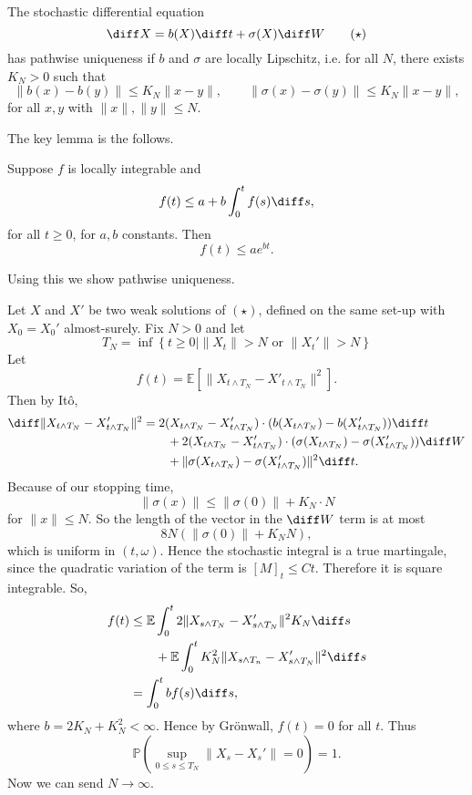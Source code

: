 \documentclass[12pt]{article}
\begin{document}
\begin{theorem}
	The stochastic differential equation
	\[
		\diff X = b(X) \diff t + \sigma(X) \diff W \tag{$\star$}
	\]
	has pathwise uniqueness if $b$ and $\sigma$ are locally Lipschitz, i.e. for all $N$, there exists $K_N > 0$ such that
	\[
	\|b(x) - b(y)\| \leq K_N \|x - y\|, \qquad \|\sigma(x) - \sigma(y)\| \leq K_N \|x - y\|,
	\]
	for all $x, y$ with $\|x\|, \|y\| \leq N$.
\end{theorem}

The key lemma is the follows.
\begin{lemma}
	Suppose $f$ is locally integrable and
	\[
	f(t) \leq a + b \int_0^{t} f(s) \diff s,
	\]
	for all $t \geq 0$, for $a, b$ constants. Then
	\[
	f(t) \leq a e^{bt}.
	\]
\end{lemma}

Using this we show pathwise uniqueness.

\begin{proofbox}
	Let $X$ and $X'$ be two weak solutions of $(\star)$, defined on the same set-up with $X_0 = X_0'$ almost-surely. Fix $N > 0$ and let
	\[
		T_N = \inf \left\{ t \geq 0 \mid \|X_t\| > N \text{ or } \|X_t'\| > N\right\}
	\]
	Let
	\[
	f(t) = \mathbb{E}\left[ \|X_{t \wedge T_N} - X'_{t \wedge T_N}\|^2 \right].
	\]
	Then by It\^o,
	\begin{align*}
		\diff \|X_{t \wedge T_N} - X'_{t \wedge T_N}\|^2 &= 2(X_{t \wedge T_N} - X'_{t \wedge T_N}) \cdot (b(X_{t \wedge T_N}) - b(X'_{t \wedge T_N})) \diff t \\
								 &\qquad + 2(X_{t \wedge T_N} - X'_{t \wedge T_N}) \cdot (\sigma(X_{t \wedge T_N}) - \sigma(X'_{t \wedge T_N})) \diff W \\
								 &\qquad + \|\sigma(X_{t \wedge T_N}) - \sigma(X'_{t \wedge T_N})\|^2 \diff t.
	\end{align*}
	Because of our stopping time,
	\[
	\|\sigma(x)\| \leq \|\sigma(0)\| + K_N \cdot N
	\]
	for $\|x\| \leq N$. So the length of the vector in the $\diff W$ term is at most
	\[
	8 N (\|\sigma(0)\| + K_N N),
	\]
	which is uniform in $(t, \omega)$. Hence the stochastic integral is a true martingale, since the quadratic variation of the term is $[M]_t \leq C t$. Therefore it is square integrable. So,
	\begin{align*}
		f(t) &\leq \mathbb{E} \int_0^{t} 2 \|X_{s \wedge T_N} - X'_{s \wedge T_N}\|^2 K_N \diff s \\
		     & \qquad + \mathbb{E} \int_0^{t} K_N^2 \|X_{s \wedge T_n} - X'_{s \wedge T_N}\|^2 \diff s \\
		     &= \int_0^{t} b f(s) \diff s,
	\end{align*}
	where $b = 2 K_N + K_N^2 < \infty$. Hence by Gr\"onwall, $f(t) = 0$ for all $t$. Thus
	\[
	\mathbb{P} \left( \sup_{ 0 \leq s \leq T_N} \|X_s - X_s'\| = 0 \right) = 1.
	\]
	Now we can send $N \to \infty$.
\end{proofbox}
\end{document}
